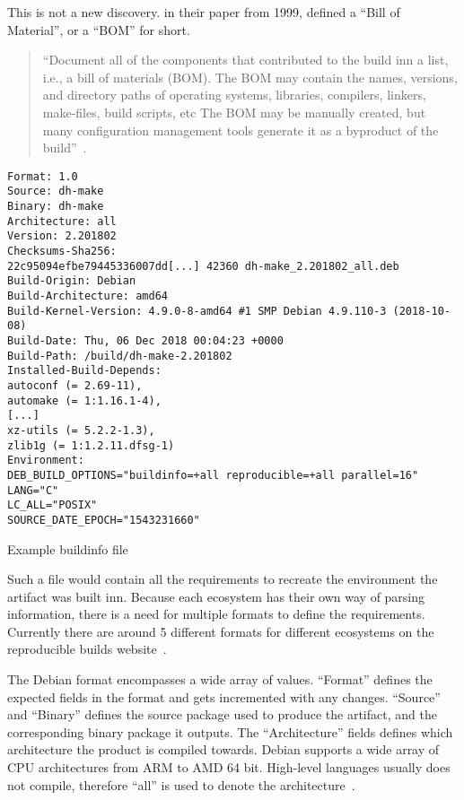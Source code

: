 \documentclass[../Main/thesis.tex]{subfiles}
\begin{document}
This is not a new discovery. \citeauthor{software-reconstruction-1999} in their
paper  from 1999, defined a ``Bill
of Material'', or a ``BOM'' for short.

\begin{quotation}
``Document all of the components that contributed to the build inn a list, i.e.,
a bill of materials (BOM). The BOM may contain the names, versions, and
directory paths of operating systems, libraries, compilers, linkers, make-files,
build scripts, etc The BOM may be manually created, but many configuration
management tools generate it as a byproduct of the build''~\cite{software-reconstruction-1999}.
\end{quotation}

\begin{listing}[H]
\begin{verbatim}
Format: 1.0
Source: dh-make
Binary: dh-make
Architecture: all
Version: 2.201802
Checksums-Sha256:
22c95094efbe79445336007dd[...] 42360 dh-make_2.201802_all.deb
Build-Origin: Debian
Build-Architecture: amd64
Build-Kernel-Version: 4.9.0-8-amd64 #1 SMP Debian 4.9.110-3 (2018-10-08)
Build-Date: Thu, 06 Dec 2018 00:04:23 +0000
Build-Path: /build/dh-make-2.201802
Installed-Build-Depends:
autoconf (= 2.69-11),
automake (= 1:1.16.1-4),
[...]
xz-utils (= 5.2.2-1.3),
zlib1g (= 1:1.2.11.dfsg-1)
Environment:
DEB_BUILD_OPTIONS="buildinfo=+all reproducible=+all parallel=16"
LANG="C"
LC_ALL="POSIX"
SOURCE_DATE_EPOCH="1543231660"
\end{verbatim}
\caption{Example buildinfo file}
\label{lst:buildinfo}
\end{listing}

Such a file would contain all the requirements to recreate the environment the
artifact was built inn. Because each ecosystem has their own way of parsing
information, there is a need for multiple formats to define the requirements.
Currently there are around 5 different formats for different ecosystems on the
reproducible builds website~\cite{reproducible-builds-2019}.

The Debian format encompasses a wide array of values. ``Format'' defines the
expected fields in the format and gets incremented with any changes.  ``Source''
and ``Binary'' defines the source package used to produce the artifact, and the
corresponding binary package it outputs. The ``Architecture'' fields defines
which architecture the product is compiled towards. Debian supports a wide array
of CPU architectures from ARM to AMD 64 bit. High-level languages usually does
not compile, therefore ``all'' is used to denote the
architecture~\cite{deb-buildinfo}.
\end{document}

